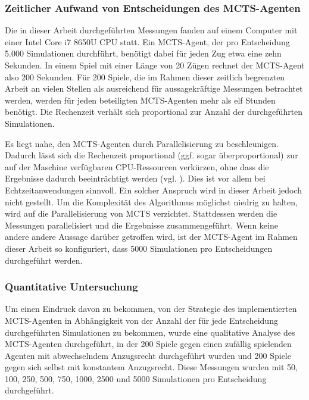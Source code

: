 \subsubsection{Zeitlicher Aufwand von Entscheidungen des MCTS-Agenten}

Die in dieser Arbeit durchgeführten Messungen fanden auf einem Computer mit einer Intel Core i7 8650U CPU statt. Ein MCTS-Agent, der pro Entscheidung 5.000 Simulationen durchführt, benötigt dabei für jeden Zug etwa eine zehn Sekunden. In einem Spiel mit einer Länge von 20 Zügen rechnet der MCTS-Agent also 200 Sekunden. Für 200 Spiele, die im Rahmen dieser zeitlich begrenzten Arbeit an vielen Stellen als ausreichend für aussagekräftige Messungen betrachtet werden, werden für jeden beteiligten MCTS-Agenten mehr als elf Stunden benötigt. Die Rechenzeit verhält sich proportional zur Anzahl der durchgeführten Simulationen.

Es liegt nahe, den MCTS-Agenten durch Parallelisierung zu beschleunigen. Dadurch lässt sich die Rechenzeit proportional (ggf. sogar überproportional) zur auf der Maschine verfügbaren CPU-Ressourcen verkürzen, ohne dass die Ergebnisse dadurch beeinträchtigt werden (vgl. \cite{Chaslot.2008}). Dies ist vor allem bei Echtzeitanwendungen sinnvoll. Ein solcher Anspruch wird in dieser Arbeit jedoch nicht gestellt. Um die Komplexität des Algorithmus möglichst niedrig zu halten, wird auf die Parallelisierung von MCTS verzichtet. Stattdessen werden die Messungen parallelisiert und die Ergebnisse zusammengeführt. Wenn keine andere andere Aussage darüber getroffen wird, ist der MCTS-Agent im Rahmen dieser Arbeit so konfiguriert, dass 5000 Simulationen pro Entscheidungen durchgeführt werden.

\subsubsection{Quantitative Untersuchung}

Um einen Eindruck davon zu bekommen, von der Strategie des implementierten MCTS-Agenten in Abhängigkeit von der Anzahl der für jede Entscheidung durchgeführten Simulationen zu bekommen, wurde eine qualitative Analyse des MCTS-Agenten durchgeführt, in der 200 Spiele gegen einen zufällig spielenden Agenten mit abwechselndem Anzugsrecht durchgeführt wurden und 200 Spiele gegen sich selbst mit konstantem Anzugsrecht. Diese Messungen wurden mit 50, 100, 250, 500, 750, 1000, 2500 und 5000 Simulationen pro Entscheidung durchgeführt.

